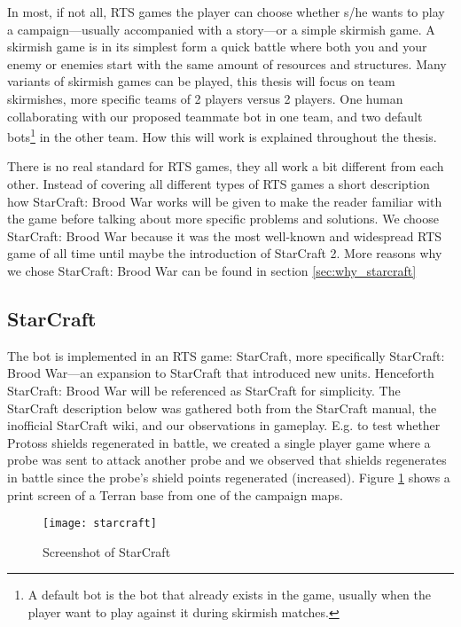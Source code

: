 In most, if not all, RTS games the player can choose whether s/he wants to play a campaign—usually
accompanied with a story—or a simple skirmish game. A skirmish game is in its simplest form a quick
battle where both you and your enemy or enemies start with the same amount of resources and
structures. Many variants of skirmish games can be played, this thesis will focus on team
skirmishes, more specific teams of 2 players versus 2 players. One human collaborating with our
proposed teammate bot in one team, and two default bots\footnote{A default bot is the bot that
already exists in the game, usually when the player want to play against it during skirmish
matches.} in the other team. How this will work is explained throughout the thesis.

There is no real standard for RTS games, they all work a bit different from each other. Instead of
covering all different types of RTS games a short description how StarCraft: Brood War works will be
given to make the reader familiar with the game before talking about more specific problems and
solutions. We choose StarCraft: Brood War because it was the most well-known and widespread RTS game
of all time until maybe the introduction of StarCraft 2. More reasons why we chose StarCraft: Brood
War can be found in section \ref{sec:why_starcraft}

\subsection{StarCraft}
The bot is implemented in an RTS game: StarCraft, more specifically StarCraft: Brood War—an expansion
to StarCraft that introduced new units. Henceforth StarCraft: Brood War will be referenced as
StarCraft for simplicity. The StarCraft description below was gathered both from the StarCraft
manual\cite{scmanual}, the inofficial StarCraft wiki\cite{scwiki}, and our observations in
gameplay. E.g. to test whether Protoss shields regenerated in battle, we created a single player
game where a probe was sent to attack another probe and we observed that shields regenerates in
battle since the probe’s shield points regenerated (increased). Figure \ref{fig:starcraft} shows a
print screen of a Terran base from one of the campaign maps.

\begin{figure}[htb]
\centering
\texttt{[image: starcraft]}
\caption{Screenshot of StarCraft}
\label{fig:starcraft}
\end{figure}


